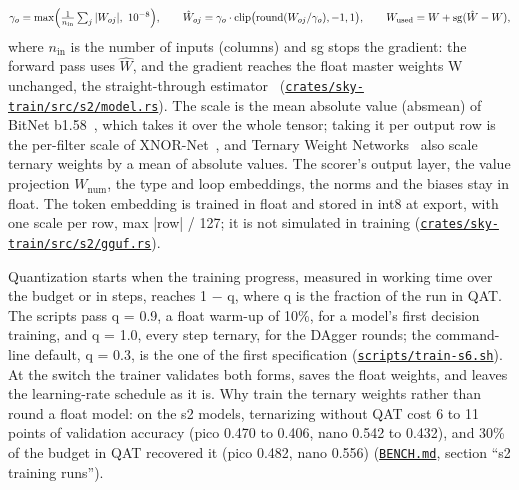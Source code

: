 \documentclass[10pt]{article}
\begin{document}
\begin{equation}\label{eq:5}
\gamma_o = \max\Bigl(\tfrac{1}{n_{\mathrm{in}}}\textstyle\sum_j |W_{oj}|,\ 10^{-8}\Bigr), \qquad
\hat W_{oj} = \gamma_o \cdot \mathrm{clip}\bigl(\mathrm{round}(W_{oj} / \gamma_o), -1, 1\bigr), \qquad
W_{\mathrm{used}} = W + \mathrm{sg}(\hat W - W),
\end{equation}
where $n_{\mathrm{in}}$ is the number of inputs (columns) and sg stops the gradient: the forward pass uses $\hat W$, and the gradient reaches the float master weights W unchanged, the straight-through estimator~\cite{bengio2013ste} (\href{https://github.com/maxgfr/skycmd/blob/main/crates/sky-train/src/s2/model.rs}{\texttt{crates/\allowbreak{}sky-train/\allowbreak{}src/\allowbreak{}s2/\allowbreak{}model.rs}}). The scale is the mean absolute value (absmean) of BitNet b1.58~\cite{ma2024bitnet}, which takes it over the whole tensor; taking it per output row is the per-filter scale of XNOR-Net~\cite{rastegari2016xnor}, and Ternary Weight Networks~\cite{li2016twn} also scale ternary weights by a mean of absolute values. The scorer's output layer, the value projection $W_{\mathrm{num}}$, the type and loop embeddings, the norms and the biases stay in float. The token embedding is trained in float and stored in int8 at export, with one scale per row, max |row| / 127; it is not simulated in training (\href{https://github.com/maxgfr/skycmd/blob/main/crates/sky-train/src/s2/gguf.rs}{\texttt{crates/\allowbreak{}sky-train/\allowbreak{}src/\allowbreak{}s2/\allowbreak{}gguf.rs}}).

Quantization starts when the training progress, measured in working time over the budget or in steps, reaches 1 $-$ q, where q is the fraction of the run in QAT. The scripts pass q = 0.9, a float warm-up of 10\%, for a model's first decision training, and q = 1.0, every step ternary, for the DAgger rounds; the command-line default, q = 0.3, is the one of the first specification (\href{https://github.com/maxgfr/skycmd/blob/main/scripts/train-s6.sh}{\texttt{scripts/\allowbreak{}train-s6.sh}}). At the switch the trainer validates both forms, saves the float weights, and leaves the learning-rate schedule as it is. Why train the ternary weights rather than round a float model: on the s2 models, ternarizing without QAT cost 6 to 11 points of validation accuracy (pico 0.470 to 0.406, nano 0.542 to 0.432), and 30\% of the budget in QAT recovered it (pico 0.482, nano 0.556) (\href{https://github.com/maxgfr/skycmd/blob/main/BENCH.md}{\texttt{BENCH.md}}, section ``s2 training runs'').
\end{document}
